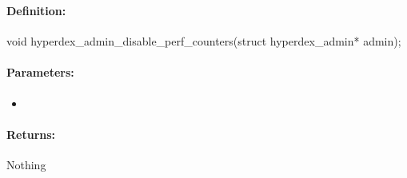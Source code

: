 \pagebreak
\subsubsection{}
\label{api:c:disable_perf_counters}


\paragraph{Definition:}
\begin{ccode}
void hyperdex_admin_disable_perf_counters(struct hyperdex_admin* admin);
\end{ccode}

\paragraph{Parameters:}
\begin{itemize}[noitemsep]
\item {}\\

\end{itemize}

\paragraph{Returns:}
Nothing